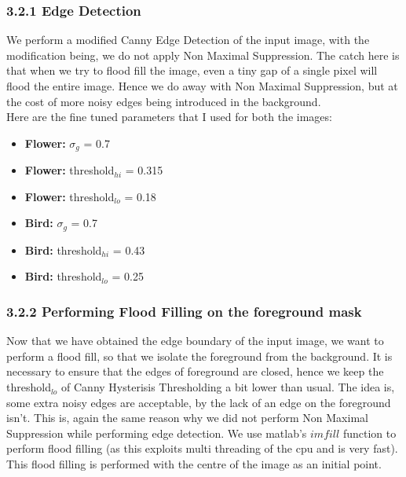 \documentclass[12pt, a4paper]{article}
\begin{document}
\subsubsection*{3.2.1 Edge Detection}
\quad\quad We perform a modified Canny Edge Detection of the input image, with the modification being, we do not apply Non Maximal Suppression. The catch here is that when we try to flood fill the image, even a tiny gap of a single pixel will flood the entire image. Hence we do away with Non Maximal Suppression, but at the cost of more noisy edges being introduced in the background. \\
Here are the fine tuned parameters that I used for both the images:
\vspace*{-8pt}
\begin{itemize}
\item \textbf{Flower: } $\sigma_{g}$ = 0.7
\item \textbf{Flower: } threshold$_{hi}$ =  0.315
\item \textbf{Flower: } threshold$_{lo}$ =  0.18
\item \textbf{Bird: } $\sigma_{g}$ = 0.7
\item \textbf{Bird: } threshold$_{hi}$ =  0.43
\item \textbf{Bird: } threshold$_{lo}$ =  0.25
\end{itemize}

\subsubsection*{3.2.2 Performing Flood Filling on the foreground mask}
\quad\quad Now that we have obtained the edge boundary of the input image, we want to perform a flood fill, so that we isolate the foreground from the background. It is necessary to ensure that the edges of foreground are closed, hence we keep the threshold$_{lo}$ of Canny Hysterisis Thresholding a bit lower than usual. The idea is, some extra noisy edges are acceptable, by the lack of an edge on the foreground isn't. This is, again the same reason why we did not perform Non Maximal Suppression while performing edge detection. We use matlab's $imfill$ function to perform flood filling (as this exploits multi threading of the cpu and is very fast). This flood filling is performed with the centre of the image as an initial point.
\end{document}
